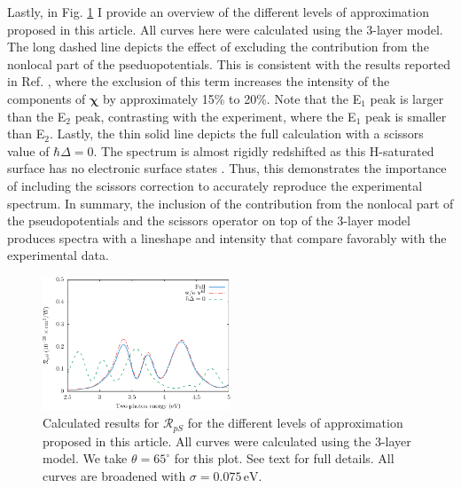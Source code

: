 Lastly, in Fig. \ref{fig:improvements} I provide an overview of the different
levels of approximation proposed in this article. All curves here were
calculated using the 3-layer model. The long dashed line depicts the effect of
excluding the contribution from the nonlocal part of the pseduopotentials. This
is consistent with the results reported in Ref. \cite{andersonPRB15}, where the
exclusion of this term increases the intensity of the components of
$\boldsymbol{\chi}$ by approximately 15\% to 20\%. Note
that the E$_{1}$ peak is larger than the E$_{2}$ peak, contrasting with the
experiment, where the E$_{1}$ peak is smaller than E$_{2}$. Lastly, the thin
solid line depicts the full calculation with a scissors value of $\hbar\Delta =
0$. The spectrum is almost rigidly redshifted as this H-saturated surface has no
electronic surface states \cite{andersonPRB15}. Thus, this demonstrates the
importance of including the scissors correction to accurately reproduce the
experimental spectrum. In summary, the inclusion of the contribution from the
nonlocal part of the pseudopotentials and the scissors operator on top of the
3-layer model produces spectra with a lineshape and intensity that compare
favorably with the experimental data.

\begin{figure}[H]
\centering
\includegraphics[width=0.5\textwidth]{content/figures/fig-4_4_03}
\caption{Calculated results for $\mathcal{R}_{pS}$ for the different levels of
approximation proposed in this article. All curves were calculated using the
3-layer model. We take $\theta=65^{\circ}$ for this plot. See text for full
details. All curves are broadened with $\sigma=0.075\,\text{eV}$.}
\label{fig:improvements}
\end{figure}


\stopcontents[chapters]
